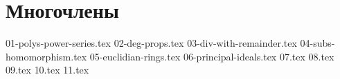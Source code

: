 \section{Многочлены}
{01-polys-power-series.tex}
{02-deg-props.tex}
{03-div-with-remainder.tex}
{04-subs-homomorphism.tex}
{05-euclidian-rings.tex}
{06-principal-ideals.tex}
{07.tex}
{08.tex}
{09.tex}
{10.tex}
{11.tex}
